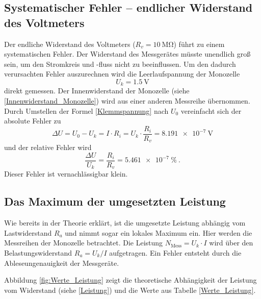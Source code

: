 \subsection{Systematischer Fehler -- endlicher Widerstand des Voltmeters}
\label{systhematischer_fehler}
Der endliche Widerstand des Voltmeters ($R_v = \SI{10}{\mega\ohm}$) führt zu einem systematischen Fehler. Der Widerstand des Messgerätes müsste unendlich groß sein, um den Stromkreis und -fluss nicht zu beeinflussen. Um den dadurch verursachten Fehler auszurechnen wird die Leerlaufspannung der Monozelle
\begin{equation}
U_k = \SI{1.5}{\volt}
\end{equation}
direkt gemessen.
Der Innenwiderstand der Monozelle (siehe \eqref{Innenwiderstand_Monozelle}) wird aus einer anderen Messreihe übernommen. Durch Umstellen der Formel \eqref{Klemmspannung} nach $U_0$ vereinfacht sich der absolute Fehler zu 
\begin{equation}
\Delta U = U_0 - U_k = I\cdot R_i = U_k \cdot \frac{R_i}{R_v} = \SI{8.191e-7}{\volt}
\end{equation}
und der relative Fehler wird 
\begin{equation}
\frac{\Delta U}{U_k} = \frac{R_i}{R_v} = \SI{5.461e-7}{\%} \ .
\end{equation}
Dieser Fehler ist vernachlässigbar klein.
 
\clearpage 
 
\subsection{Das Maximum der umgesetzten Leistung}
Wie bereits in der Theorie erklärt, ist die umgesetzte Leistung abhängig vom Lastwiderstand $R_a$ und nimmt sogar ein lokales Maximum ein. Hier werden die Messreihen der Monozelle betrachtet. Die Leistung $N_\text{Mess} = U_k \cdot I $ wird über den Belastungswiderstand $R_a = U_k / I$ aufgetragen. Ein Fehler entsteht durch die Ableseungenauigkeit der Messgeräte.

\begin{center}

\label{Werte_Leistung}
\end{center}

Abbildung \ref{fig:Werte_Leistung} zeigt die theoretische Abhängigkeit der Leistung vom Widerstand (siehe \eqref{Leistung}) und die Werte aus Tabelle \ref{Werte_Leistung}.

